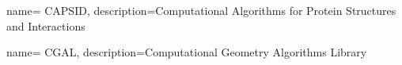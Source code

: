 

 {
    name= CAPSID,
    description=Computational Algorithms for Protein Structures and Interactions
}

 {
    name= CGAL,
    description=Computational Geometry Algorithms Library
}



